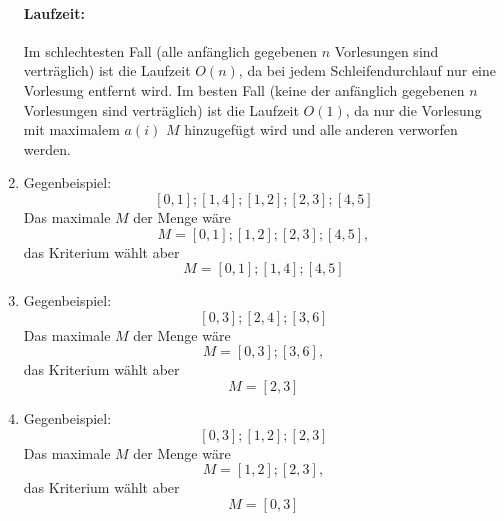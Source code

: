 \documentclass[a4paper,10pt]{article}
\begin{document}
\begin{enumerate}
        \paragraph*{Laufzeit:} Im schlechtesten Fall (alle anfänglich gegebenen $n$ Vorlesungen sind verträglich) ist die Laufzeit $O(n)$, da bei jedem Schleifendurchlauf nur eine Vorlesung entfernt wird.
        Im besten Fall (keine der anfänglich gegebenen $n$ Vorlesungen sind verträglich) ist die Laufzeit $O(1)$, da nur die Vorlesung mit maximalem $a(i)$ $M$ hinzugefügt wird und alle anderen verworfen werden.
\item   Gegenbeispiel:
        \[[0,1];[1,4];[1,2];[2,3];[4,5]\]
        Das maximale $M$ der Menge wäre 
        \[M = [0,1];[1,2];[2,3];[4,5],\] 
        das Kriterium wählt aber 
        \[M = [0,1];[1,4];[4,5]\]
\item   Gegenbeispiel:
        \[[0,3];[2,4];[3,6]\]
        Das maximale $M$ der Menge wäre 
        \[M = [0,3];[3,6],\] 
        das Kriterium wählt aber 
        \[M = [2,3]\]
\item   Gegenbeispiel:
        \[[0,3];[1,2];[2,3]\]
        Das maximale $M$ der Menge wäre 
        \[M = [1,2];[2,3],\] 
        das Kriterium wählt aber 
        \[M = [0,3]\]
\end{enumerate}
\end{document}

